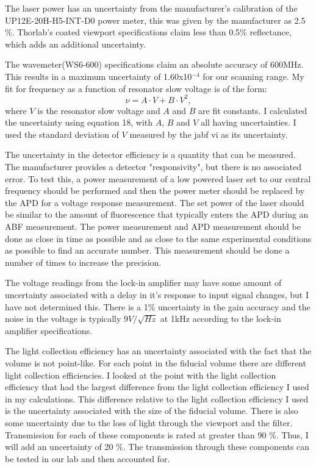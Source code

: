 \documentclass[12pt, a4paper]{article}
\begin{document}
The laser power has an uncertainty from the manufacturer's calibration of the UP12E-20H-H5-INT-D0 power meter, this was given by the manufacturer as 2.5 \%. Thorlab's coated viewport specifications claim less than 0.5\% reflectance, which adds an additional uncertainty.

The wavemeter(WS6-600) specifications claim an absolute accuracy of 600MHz. This results in a maximum uncertainty of 1.60x10$^{-4}$ for our scanning range. My fit for frequency as a function of resonator slow voltage is of the form:
\begin{equation}
\nu = A \cdot V + B \cdot V^2,
\end{equation}
where $V$ is the resonator slow voltage and $A$ and $B$ are fit constants. I calculated the uncertainty using equation 18, with $A$, $B$ and $V$ all having uncertainties. I used the standard deviation of $V$ measured by the jabf vi as its uncertainty.

The uncertainty in the detector efficiency is a quantity that can be measured. The manufacturer provides a detector "responsivity", but there is no associated error. To test this, a power measurement of a low powered laser set to our central frequency should be performed and then the power meter should be replaced by the APD for a voltage response measurement. The set power of the laser should be similar to the amount of fluorescence that typically enters the APD during an ABF measurement. The power measurement and APD measurement should be done as close in time as possible and as close to the same experimental conditions as possible to find an accurate number. This measurement should be done a number of times to increase the precision.

The voltage readings from the lock-in amplifier may have some amount of uncertainty associated with a delay in it's response to input signal changes, but I have not determined this. There is a 1\% uncertainty in the gain accuracy and the noise in the voltage is typically $9V/\sqrt{Hz}$ at 1kHz according to the lock-in amplifier specifications. 

The light collection efficiency has an uncertainty associated with the fact that the volume is not point-like. For each point in the fiducial volume there are different light collection efficiencies. I looked at the point with the light collection efficiency that had the largest difference from the light collection efficiency I used in my calculations. This difference relative to the light collection efficiency I used is the uncertainty associated with the size of the fiducial volume. There is also some uncertainty due to the loss of light through the viewport and the filter. Transmission for each of these components is rated at greater than 90 \%. Thus, I will add an uncertainty of 20 \%. The transmission through these components can be tested in our lab and then accounted for. 
\end{document}
